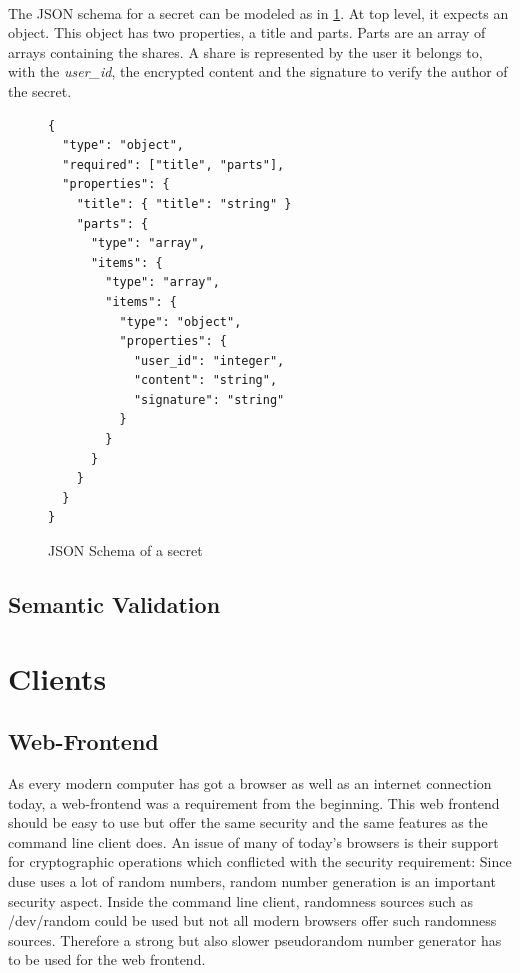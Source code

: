 \paragraph{}{ 
  
  The JSON schema for a secret can be modeled as in
  \ref{code:secret_json_schema}. At top level, it expects an object. This
  object has two properties, a title and parts. Parts are an array of arrays
  containing the shares. A share is represented by the user it belongs to, with
  the \textit{user\_id}, the encrypted content and the signature to verify the
  author of the secret.

}

\begin{figure}
\begin{lstlisting}
{
  "type": "object",
  "required": ["title", "parts"],
  "properties": {
    "title": { "title": "string" }
    "parts": {
      "type": "array",
      "items": {
        "type": "array",
        "items": {
          "type": "object",
          "properties": {
            "user_id": "integer",
            "content": "string",
            "signature": "string"
          }
        }
      }
    }
  }
}
\end{lstlisting}
\caption{JSON Schema of a secret}
\label{code:secret_json_schema}
\end{figure}

\subsection{Semantic Validation}

\section{Clients}

\subsection{Web-Frontend}

As every modern computer has got a browser as well as an internet connection today,
a web-frontend was a requirement from the beginning. This web frontend should be
easy to use but offer the same security and the same features as the command line
client does. An issue of many of today's browsers is their support for
cryptographic operations which conflicted with the security requirement:
Since duse uses a lot of random numbers, random number generation is an important
security aspect. Inside the command line client, randomness sources such as
/dev/random could be used but not all modern browsers offer such randomness
sources. Therefore a strong but also slower pseudorandom number generator has
to be used for the web frontend.

